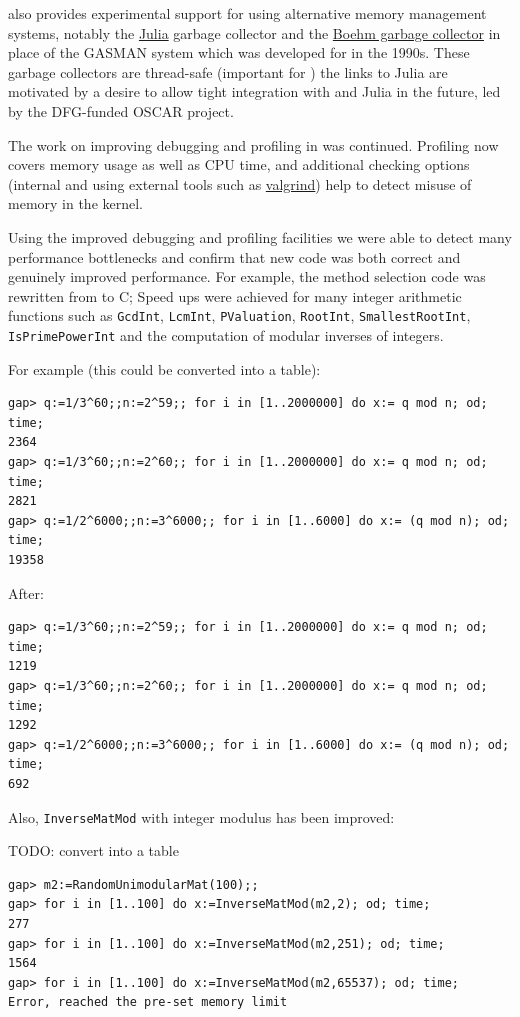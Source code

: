 \documentclass{deliverablereport}
\begin{document}
 also provides experimental support for using alternative
memory management systems, notably the \href{??}{Julia} garbage
collector and the \href{???}{Boehm garbage collector} in place of
the GASMAN system which was developed for  in the 1990s.
These garbage collectors are thread-safe (important for \HPCGAP) the
links to Julia are
motivated by a desire to allow tight integration with \GAP and Julia 
in the future, led by  the DFG-funded OSCAR project.

The work on improving debugging and profiling in \GAP was
continued. Profiling now covers memory usage as well as CPU time, and
additional checking options (internal and using external tools such as
\href{???}{valgrind}) help to detect misuse of memory in the kernel.

Using the improved debugging and profiling facilities we were able to detect many
performance bottlenecks and confirm that new code was both correct and
genuinely improved performance.
For example, the method selection code was rewritten from \GAP to C;
Speed ups were achieved for many integer arithmetic functions such as
\verb|GcdInt|, \verb|LcmInt|, \verb|PValuation|, 
\verb|RootInt|, \verb|SmallestRootInt|, \verb|IsPrimePowerInt|
and the computation of modular inverses of integers.

For example (this could be converted into a table):

{\small
\begin{verbatim}
gap> q:=1/3^60;;n:=2^59;; for i in [1..2000000] do x:= q mod n; od; time;
2364
gap> q:=1/3^60;;n:=2^60;; for i in [1..2000000] do x:= q mod n; od; time;
2821
gap> q:=1/2^6000;;n:=3^6000;; for i in [1..6000] do x:= (q mod n); od; time;
19358
\end{verbatim}
}

After:

{\small
\begin{verbatim}
gap> q:=1/3^60;;n:=2^59;; for i in [1..2000000] do x:= q mod n; od; time;
1219
gap> q:=1/3^60;;n:=2^60;; for i in [1..2000000] do x:= q mod n; od; time;
1292
gap> q:=1/2^6000;;n:=3^6000;; for i in [1..6000] do x:= (q mod n); od; time;
692
\end{verbatim}
}

Also, \verb|InverseMatMod| with integer modulus has been improved:%

TODO: convert into a table

{\small
\begin{verbatim}
gap> m2:=RandomUnimodularMat(100);;
gap> for i in [1..100] do x:=InverseMatMod(m2,2); od; time;
277
gap> for i in [1..100] do x:=InverseMatMod(m2,251); od; time;
1564
gap> for i in [1..100] do x:=InverseMatMod(m2,65537); od; time;
Error, reached the pre-set memory limit
\end{verbatim}
}
\end{document}
